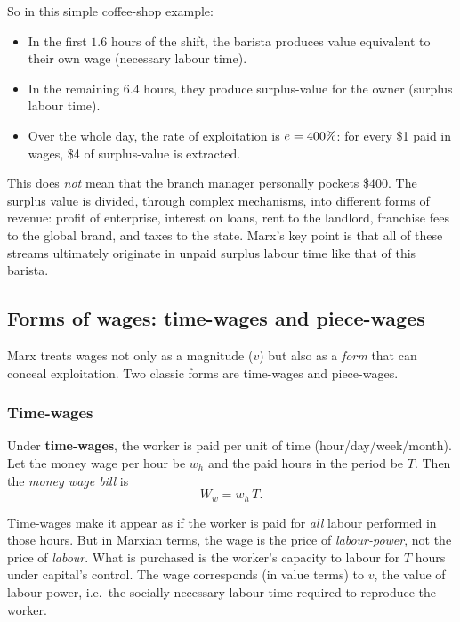 \begin{example}
So in this simple coffee-shop example:

\begin{itemize}[leftmargin=1.5em]
  \item In the first $1.6$ hours of the shift, the barista produces value
        equivalent to their own wage (necessary labour time).
  \item In the remaining $6.4$ hours, they produce surplus-value for the owner
        (surplus labour time).
  \item Over the whole day, the rate of exploitation is $e = 400\%$:
        for every \$1 paid in wages, \$4 of surplus-value is extracted.
\end{itemize}

This does \emph{not} mean that the branch manager personally pockets
\$400. The surplus value is divided, through complex mechanisms, into
different forms of revenue: profit of enterprise, interest on loans,
rent to the landlord, franchise fees to the global brand, and taxes to
the state. Marx’s key point is that all of these streams ultimately
originate in unpaid surplus labour time like that of this barista.

\end{example}

\subsection{Forms of wages: time-wages and piece-wages}
\label{sec:wage-forms}

Marx treats wages not only as a magnitude ($v$) but also as a \emph{form} that can
conceal exploitation.\cite{Marx1867} Two classic forms are time-wages and piece-wages.

\subsubsection*{Time-wages}

Under \textbf{time-wages}, the worker is paid per unit of time (hour/day/week/month).
Let the money wage per hour be $w_h$ and the paid hours in the period be $T$.
Then the \emph{money wage bill} is
\[
  W_w = w_h \, T.
\]

Time-wages make it appear as if the worker is paid for \emph{all} labour performed in
those hours. But in Marxian terms, the wage is the price of \emph{labour-power}, not the
price of \emph{labour}. What is purchased is the worker's capacity to labour for $T$
hours under capital's control. The wage corresponds (in value terms) to $v$, the value of
labour-power, i.e.\ the socially necessary labour time required to reproduce the worker.

